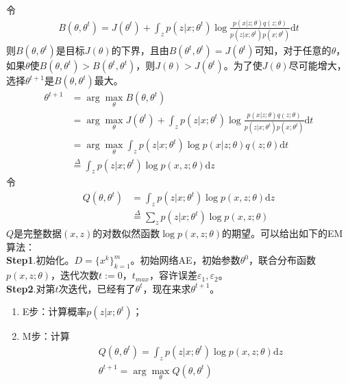             令
            \begin{align*}
            B(\theta,\theta^t) = J(\theta^t) + \int_zp(z|x;\theta^t) \log\frac{p(x|z;\theta) q(z;\theta)}{p(z|x;\theta^t)p(x;\theta^t)}\mathrm{d}t
            \end{align*}
            则$B(\theta,\theta^t)$是目标$J(\theta)$的下界，且由$B(\theta^t,\theta^t) = J(\theta^t)$可知，对于任意的$\theta$，如果$\theta$使$B(\theta ,\theta^t)>B(\theta^t,\theta^t)$，则$J(\theta)>J(\theta^t)$。为了使$J(\theta)$尽可能增大，选择$\theta^{t+1}$是$B(\theta,\theta^t)$最大。
            \begin{align*}
            \theta^{t+1} & = \arg \max_\theta B(\theta,\theta^t)\\
            & = \arg \max_\theta J(\theta^t) + \int_zp(z|x;\theta^t) \log\frac{p(x|z;\theta) q(z;\theta)}{p(z|x;\theta^t)p(x;\theta^t)}\mathrm{d}t\\
            & = \arg \max_\theta \int_z p(z|x;\theta^t) \log p(x|z;\theta)q(z;\theta)\mathrm{d}t\\
            & \overset{\Delta}{= } \int_z p(z|x;\theta^t)\log p(x,z;\theta)\mathrm{d}z
            \end{align*}
            令
            \begin{align*}
            Q(\theta,\theta^t) & = \int_z p(z|x;\theta^t)\log p(x,z;\theta)\mathrm{d}z\\
            & \overset{\Delta}{=} \sum_z p(z|x;\theta^t)\log p(x,z;\theta)
            \end{align*}
            $Q$是完整数据$(x,z)$的对数似然函数$\log p(x,z;\theta)$的期望。可以给出如下的EM算法：\\
            \textbf{Step1}.初始化。$D = \{x^k\}_{k=1}^m$。初始网络AE，初始参数$\theta^0$，联合分布函数$p(x,z;\theta)$，迭代次数$t:=0$，$t_{max}$，容许误差$\varepsilon_1,\varepsilon_2$。\\
            \textbf{Step2}.对第$t$次迭代，已经有了$\theta^t$，现在来求$\theta^{t+1}$。
            \begin{enumerate}
            \item E步：计算概率$p(z|x;\theta^t)$；
            \item M步：计算
            \begin{align*}
            & Q(\theta,\theta^t)= \int_z p(z|x;\theta^t)\log p(x,z;\theta)\mathrm{d}z\\
            & \theta^{t+1} = \arg\max_\theta Q(\theta,\theta^t)
            \end{align*}
            \end{enumerate}
